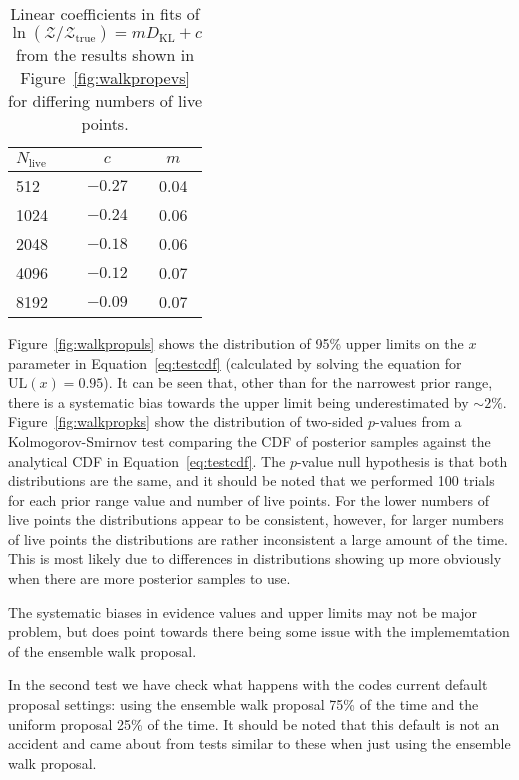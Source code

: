 \begin{table}[h]
\caption{Linear coefficients in fits of $\ln{(\mathcal{Z}/\mathcal{Z}_{\text{true}})} = mD_{\text{KL}} + c$ from the results
shown in Figure~\ref{fig:walkpropevs} for differing numbers of live points.\label{tab:klvsz}}
\begin{center}
\begin{tabular}{l c c}
\hline
\hline
$N_{\text{live}}$ & $c$ & $m$ \\
\hline
512 & $-0.27$ & 0.04 \\
1024 & $-0.24$ & 0.06 \\
2048 & $-0.18$ & 0.06 \\
4096 & $-0.12$ & 0.07 \\
8192 & $-0.09$ & 0.07 \\
\hline
\end{tabular}
\end{center}
\end{table}

Figure~\ref{fig:walkpropuls} shows the distribution of 95\% upper limits on the $x$ parameter in Equation~\ref{eq:testcdf} (calculated by solving
the equation for $\text{UL}(x) = 0.95$). It can be seen that, other than for the narrowest prior range, there is a systematic bias towards the
upper limit being underestimated by $\sim 2\%$. Figure~\ref{fig:walkpropks} show the distribution of two-sided $p$-values from a Kolmogorov-Smirnov
test comparing the CDF of posterior samples against the analytical CDF in Equation~\ref{eq:testcdf}. The $p$-value null hypothesis is that both
distributions are the same, and it should be noted that we performed 100 trials for each prior range value and number of live points. For the
lower numbers of live points the distributions appear to be consistent, however, for larger numbers of live points the distributions are rather
inconsistent a large amount of the time. This is most likely due to differences in distributions showing up more obviously when there are more
posterior samples to use.

The systematic biases in evidence values and upper limits may not be major problem, but does point towards there being some issue with the
implememtation of the ensemble walk proposal.

In the second test we have check what happens with the codes current default proposal settings: using the ensemble walk proposal 75\%
of the time and the uniform proposal 25\% of the time. It should be noted that this default is not an accident and came about from tests
similar to these when just using the ensemble walk proposal.

